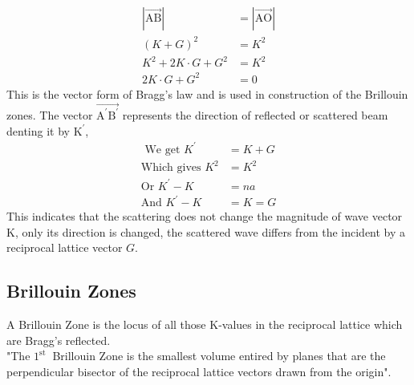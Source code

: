 \begin{align*}
|\overrightarrow{\mathrm{AB}}|&=|\overrightarrow{\mathrm{AO}}| \\
(K+G)^{2}&=K^{2} \\
K^{2}+2 K \cdot G+G^{2}&=K^{2} \\
2 K \cdot G+G^{2}&=0
\end{align*}
This is the vector form of Bragg's law and is used in construction of the Brillouin zones.
The vector $\overrightarrow{\mathrm{A}^{\prime} \mathrm{B}^{\prime}}$ represents the direction of reflected or scattered beam denting it by $\mathrm{K}^{\prime}$,
\begin{align*}
\text{ We get }K^{\prime}&=K+G\\
\text{Which gives } K^{2}&=K^{2}\\ 
\text{Or } K^{\prime}-K&=n a\\
\text{And }K^{\prime}-K&=K=G
\end{align*}
This indicates that the scattering does not change the magnitude of wave vector $\mathrm{K}$, only its direction is changed, the scattered wave differs from the incident by a reciprocal lattice vector $G$. 
\subsection{Brillouin Zones}
A Brillouin Zone is the locus of all those $\mathrm{K}$-values in the reciprocal lattice which are Bragg's reflected.\\
"The $1^{\text {st }}$ Brillouin Zone is the smallest volume entired by planes that are the perpendicular bisector of the reciprocal lattice vectors drawn from the origin".
